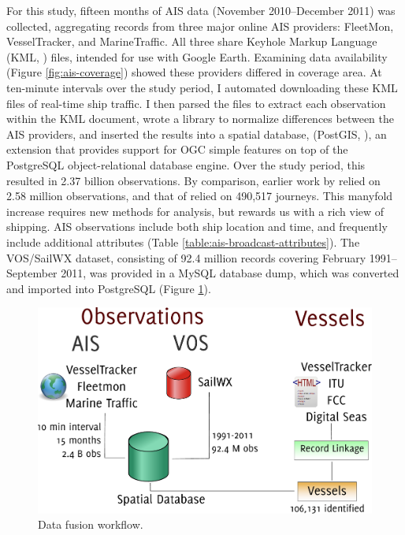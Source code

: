 For this study, fifteen months of AIS data (November 2010--December 2011) was collected, aggregating records from three major online AIS providers: FleetMon, VesselTracker, and MarineTraffic. All three share Keyhole Markup Language (KML, \citeauthor{KML}) files, intended for use with Google Earth. Examining data availability (Figure \ref{fig:ais-coverage}) showed these providers differed in coverage area. At ten-minute intervals over the study period, I automated downloading these KML files of real-time ship traffic. I then parsed the files to extract each observation within the KML document, wrote a library to normalize differences between the AIS providers, and inserted the results into a spatial database, (PostGIS, \citeauthor{ramsey2005postgis}), an extension that provides support for OGC simple features \citep{OGCSimple} on top of the PostgreSQL \citep{postgresql} object-relational database engine. Over the study period, this resulted in 2.37 billion observations. By comparison, earlier work by \cite{Halpern2008} relied on 2.58 million observations, and that of \cite{Kaluza2010} relied on 490,517 journeys. This manyfold increase requires new methods for analysis, but rewards us with a rich view of shipping. %
AIS observations include both ship location and time, and frequently include additional attributes (Table \ref{table:ais-broadcast-attributes}).  The VOS/SailWX dataset, consisting of 92.4 million records covering February 1991--September 2011, was provided in a MySQL database dump, which was converted and imported into PostgreSQL (Figure \ref{fig:record-workflow}).

\begin{figure}[htbp]
  \centering
  \includegraphics[width=120mm]{figures/record-workflow.pdf}
  \caption[Data fusion workflow]{Data fusion workflow.}
  \label{fig:record-workflow}
\end{figure}


